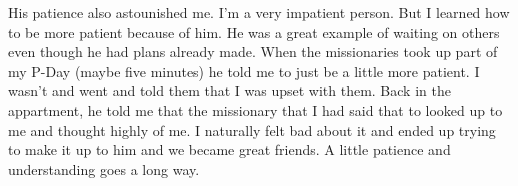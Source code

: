 \begin{entry}
{His patience also astounished me.  I'm a very impatient person.  But I learned how to be more patient because of him.  He was a great example of waiting on others even though he had plans already made.  When the missionaries took up part of my P-Day (maybe five minutes) he told me to just be a little more patient.  I wasn't and went and told them that I was upset with them.  Back in the appartment, he told me that the missionary that I had said that to looked up to me and thought highly of me.  I naturally felt bad about it and ended up trying to make it up to him and we became great friends.  A little patience and understanding goes a long way.}
\end{entry}

